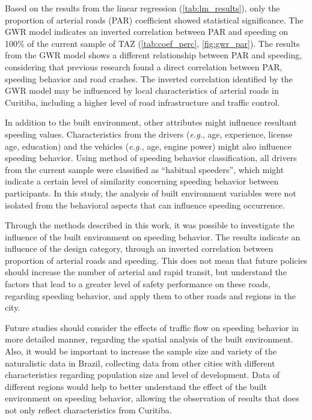 Based on the results from the linear regression (\autoref{tab:lm_results}), only the proportion of arterial roads (PAR) coefficient showed statistical significance. The GWR model indicates an inverted correlation between PAR and speeding on 100\% of the current sample of TAZ (\autoref{tab:coef_perc}, \autoref{fig:gwr_par}). The results from the GWR model shows a different relationship between PAR and speeding, considering that previous research found a direct correlation between PAR, speeding behavior and road crashes. The inverted correlation identified by the GWR model may be influenced by local characteristics of arterial roads in Curitiba, including a higher level of road infrastructure and traffic control.

In addition to the built environment, other attributes might influence resultant speeding values. Characteristics from the drivers (\textit{e.g.}, age, experience, license age, education) and the vehicles (\textit{e.g.}, age, engine power) might also influence speeding behavior. Using \textcite{Richard2013a} method of speeding behavior classification, all drivers from the current sample were classified as ``habitual speeders'', which might indicate a certain level of similarity concerning speeding behavior between participants. In this study, the analysis of built environment variables were not isolated from the behavioral aspects that can influence speeding occurrence.

Through the methods described in this work, it was possible to investigate the influence of the built environment on speeding behavior. The results indicate an influence of the design category, through an inverted correlation between proportion of arterial roads and speeding. This does not mean that future policies should increase the number of arterial and rapid transit, but understand the factors that lead to a greater level of safety performance on these roads, regarding speeding behavior, and apply them to other roads and regions in the city. 

Future studies should consider the effects of traffic flow on speeding behavior in more detailed manner, regarding the spatial analysis of the built environment. Also, it would be important to increase the sample size and variety of the naturalistic data in Brazil, collecting data from other cities with different characteristics regarding population size and level of development. Data of different regions would help to better understand the effect of the built environment on speeding behavior, allowing the observation of results that does not only reflect characteristics from Curitiba. 